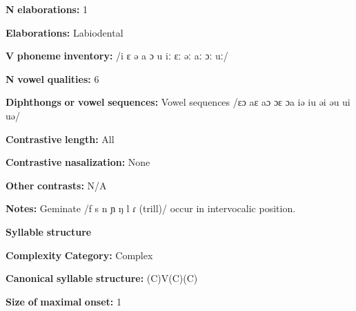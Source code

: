\begin{styleBody}
\textbf{N} \textbf{elaborations:} 1
\end{styleBody}

\begin{styleBody}
\textbf{Elaborations:} Labiodental
\end{styleBody}

\begin{styleBody}
\textbf{V} \textbf{phoneme} \textbf{inventory:} /i ɛ ə a ɔ u iː ɛː əː aː ɔː uː/
\end{styleBody}

\begin{styleBody}
\textbf{N} \textbf{vowel} \textbf{qualities:} 6
\end{styleBody}

\begin{styleBody}
\textbf{Diphthongs} \textbf{or} \textbf{vowel} \textbf{sequences:} Vowel sequences /ɛɔ aɛ aɔ ɔɛ ɔa iə iu əi əu ui uə/
\end{styleBody}

\begin{styleBody}
\textbf{Contrastive} \textbf{length:} All
\end{styleBody}

\begin{styleBody}
\textbf{Contrastive} \textbf{nasalization:} None
\end{styleBody}

\begin{styleBody}
\textbf{Other} \textbf{contrasts:} N/A
\end{styleBody}

\begin{styleBody}
\textbf{Notes:} Geminate /f s n ɲ ŋ l ɾ (trill)/ occur in intervocalic position.
\end{styleBody}

\begin{styleBody}
\textbf{Syllable} \textbf{structure}
\end{styleBody}

\begin{styleBody}
\textbf{Complexity} \textbf{Category:} Complex
\end{styleBody}

\begin{styleBody}
\textbf{Canonical} \textbf{syllable} \textbf{structure:} (C)V(C)(C) \citep[36-43]{Stirtz2011}
\end{styleBody}

\begin{styleBody}
\textbf{Size} \textbf{of} \textbf{maximal} \textbf{onset:} 1
\end{styleBody}

